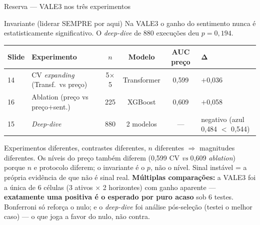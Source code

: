 \documentclass[10pt,aspectratio=169]{beamer}
\begin{document}
\appendix
\begin{frame}{Reserva --- VALE3 nos três experimentos}
  \begin{block}{Invariante (liderar SEMPRE por aqui)}
    \centering Na VALE3 o ganho do sentimento \alert{nunca é estatisticamente significativo}.
    O \textit{deep-dive} de 880 execuções deu \textbf{$p = 0{,}194$}.
  \end{block}
  \vspace{1ex}
  \begin{table}
    \footnotesize
    \begin{tabular}{llcccl}
      \toprule
      \textbf{Slide} & \textbf{Experimento} & \textbf{$n$} & \textbf{Modelo} & \textbf{AUC preço} & $\boldsymbol{\Delta}$ \\
      \midrule
      14 & CV \textit{expanding} (Transf.\ vs preço) & 5$\times$5 & Transformer & 0{,}599 & $+$0{,}036 \\
      16 & Ablation (preço vs preço$+$sent.)        & 225        & XGBoost     & 0{,}609 & $+$0{,}058 \\
      15 & \textit{Deep-dive}                       & 880        & 2 modelos   & ---      & negativo (azul 0{,}484 $<$ 0{,}544) \\
      \bottomrule
    \end{tabular}
  \end{table}
  \vspace{1ex}
  {\footnotesize Experimentos diferentes, contrastes diferentes, $n$ diferentes $\Rightarrow$ magnitudes diferentes.
  Os níveis do preço também diferem (0{,}599 CV \textit{vs} 0{,}609 \textit{ablation}) porque $n$ e protocolo diferem; o invariante é o \textbf{$p$}, não o nível. Sinal instável = a própria evidência de que não é sinal real.}
  \vspace{1ex}
  {\footnotesize \textbf{Múltiplas comparações:} a VALE3 foi a \alert{única de 6} células (3 ativos $\times$ 2 horizontes) com ganho aparente --- \textbf{exatamente uma positiva é o esperado por puro acaso} sob 6 testes. Bonferroni só \alert{reforça} o nulo; e o \textit{deep-dive} foi análise pós-seleção (testei o melhor caso) --- o que joga \alert{a favor} do nulo, não contra.}
\end{frame}
\end{document}
